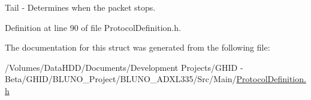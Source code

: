 \-Tail -\/ \-Determines when the packet stops. 



\-Definition at line 90 of file \-Protocol\-Definition.\-h.



\-The documentation for this struct was generated from the following file\-:\begin{DoxyCompactItemize}
\item 
/\-Volumes/\-Data\-H\-D\-D/\-Documents/\-Development Projects/\-G\-H\-I\-D -\/ Beta/\-G\-H\-I\-D/\-B\-L\-U\-N\-O\-\_\-\-Project/\-B\-L\-U\-N\-O\-\_\-\-A\-D\-X\-L335/\-Src/\-Main/\hyperlink{_protocol_definition_8h}{\-Protocol\-Definition.\-h}\end{DoxyCompactItemize}
